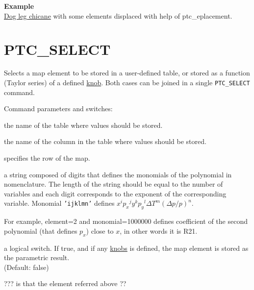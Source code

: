 {\bf Example }\\
\href{http://cern.ch/frs/mad-X_examples/ptc_madx_interface/eplacement/eplacement.madx}{Dog
  leg chicane} with some elements displaced with help of
ptc\_eplacement.

 
% 

\section{PTC\_SELECT}
\label{sec:ptc_select}

Selects a map element to be stored in a user-defined table, or stored as
a function (Taylor series) of a defined \hyperref[sec:ptc_knob]{knob}.
Both cases can be joined in a single {\tt PTC\_SELECT} command.  


Command parameters and switches: 
\begin{madlist}
    the name of the table where values should be
   stored. 

    the name of the column in the table where values
   should be stored.

    specifies the row of the map.   

    a string composed of digits that defines the
   monomials of the polynomial in \ptc nomenclature. The length of the
   string should be equal to the number of variables and each digit
   corresponds to the exponent of the corresponding variable. 
   Monomial {\tt 'ijklmn'} defines $x^i {p_x}^j y^k {p_y}^l \Delta T^m
   (\Delta p/p)^n$. 

   For example, element=2 and monomial=1000000 defines coefficient of
   the second polynomial (that defines $p_x$) close to $x$, in other
   words it is R21.   

    a logical switch. If true, and if any
   \hyperref[sec:ptc_Knob]{knobs} is defined, the map element is stored
   as the parametric result. \\ (Default: false) 
   
    ??? is that the element referred above ??

\end{madlist}


